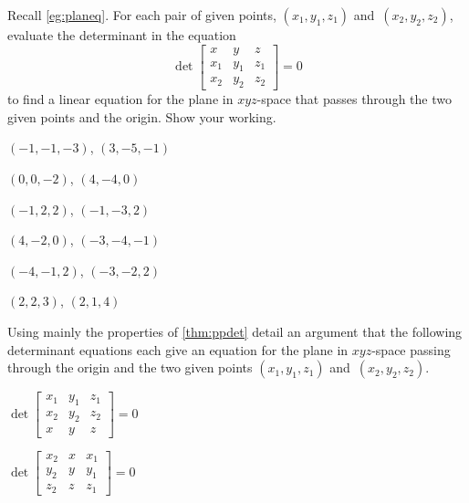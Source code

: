 \begin{exercise}  
Recall \cref{eg:planeq}.
For each pair of given points, \((x_1,y_1,z_1)\) and~\((x_2,y_2,z_2)\), evaluate the determinant in the equation
\begin{equation*}
\det\begin{bmatrix} x&y&z\\x_1&y_1&z_1\\x_2&y_2&z_2 \end{bmatrix}=0
\end{equation*}
to find a linear equation for the plane in \(xyz\)-space that passes through the two given points and the origin.
Show your working.
\begin{Parts}
\item \((-1,-1,-3)\), \((3,-5,-1)\)

\begin{OmitV1}
\item \((0,0,-2)\), \((4,-4,0)\)

\item \((-1,2,2)\), \((-1,-3,2)\)
\end{OmitV1}

\item \((4,-2,0)\), \((-3,-4,-1)\)

\item \((-4,-1,2)\), \((-3,-2,2)\)

\item \((2,2,3)\), \((2,1,4)\)

\end{Parts}
\end{exercise}




\begin{exercise}  
Using mainly the properties of \cref{thm:ppdet} detail an argument that the following determinant equations each give an equation for the plane in \(xyz\)-space passing through the origin and the two given points \((x_1,y_1,z_1)\) and~\((x_2,y_2,z_2)\).
\begin{Parts}
\item \(\det\begin{bmatrix} x_1&y_1&z_1
\\x_2&y_2&z_2
\\x&y&z \end{bmatrix}=0\)

\item \(\det\begin{bmatrix} x_2&x&x_1
\\y_2&y&y_1
\\z_2&z&z_1 \end{bmatrix}=0\)

\end{Parts}
\end{exercise}








